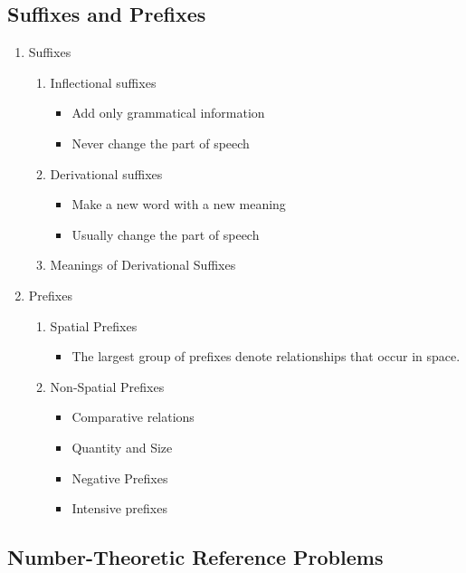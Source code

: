 \documentclass[12pt]{article}
\begin{document}
\subsection{Suffixes and Prefixes}
\begin{enumerate}
\item Suffixes 
\begin{enumerate}
\item Inflectional suffixes
\begin{itemize}
\item Add only grammatical information
\item Never change the part of speech
\end{itemize}
\item Derivational suffixes
\begin{itemize}
\item Make a new word with a new meaning
\item Usually change the part of speech
\end{itemize}
\item Meanings of Derivational Suffixes
\end{enumerate}

\item Prefixes
\begin{enumerate} 
\item Spatial Prefixes
\begin{itemize}
\item The largest group of prefixes denote relationships that occur in space.
\end{itemize}
\item Non-Spatial Prefixes
\begin{itemize}
\item Comparative relations
\item Quantity and Size
\item Negative Prefixes
\item Intensive prefixes
\end{itemize}
\end{enumerate}
\end{enumerate}



\pagebreak
\vspace*{\fill}
\begin{center}
\section{Number-Theoretic Reference Problems}
\end{center}
\vspace*{\fill}
\pagebreak
\end{document}
